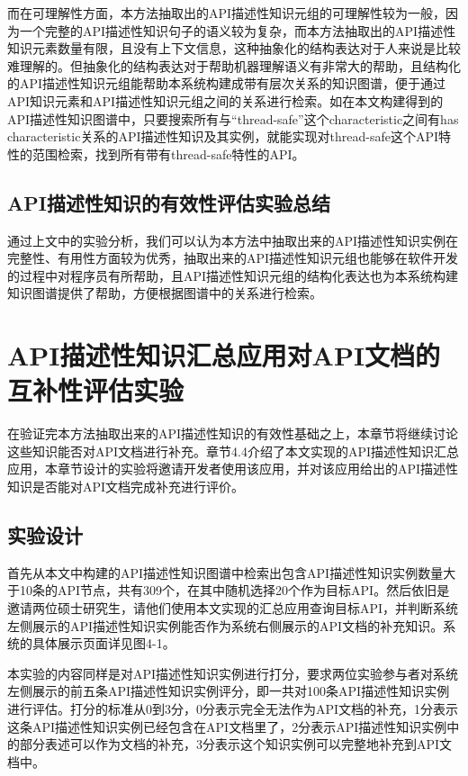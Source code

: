 而在可理解性方面，本方法抽取出的API描述性知识元组的可理解性较为一般，因为一个完整的API描述性知识句子的语义较为复杂，而本方法抽取出的API描述性知识元素数量有限，且没有上下文信息，这种抽象化的结构表达对于人来说是比较难理解的。但抽象化的结构表达对于帮助机器理解语义有非常大的帮助，且结构化的API描述性知识元组能帮助本系统构建成带有层次关系的知识图谱，便于通过API知识元素和API描述性知识元组之间的关系进行检索。如在本文构建得到的API描述性知识图谱中，只要搜索所有与“thread-safe”这个characteristic之间有has characteristic关系的API描述性知识及其实例，就能实现对thread-safe这个API特性的范围检索，找到所有带有thread-safe特性的API。

\subsection{API描述性知识的有效性评估实验总结}
通过上文中的实验分析，我们可以认为本方法中抽取出来的API描述性知识实例在完整性、有用性方面较为优秀，抽取出来的API描述性知识元组也能够在软件开发的过程中对程序员有所帮助，且API描述性知识元组的结构化表达也为本系统构建知识图谱提供了帮助，方便根据图谱中的关系进行检索。

\section{API描述性知识汇总应用对API文档的互补性评估实验}
在验证完本方法抽取出来的API描述性知识的有效性基础之上，本章节将继续讨论这些知识能否对API文档进行补充。章节4.4介绍了本文实现的API描述性知识汇总应用，本章节设计的实验将邀请开发者使用该应用，并对该应用给出的API描述性知识是否能对API文档完成补充进行评价。

\subsection{实验设计}
首先从本文中构建的API描述性知识图谱中检索出包含API描述性知识实例数量大于10条的API节点，共有309个，在其中随机选择20个作为目标API。然后依旧是邀请两位硕士研究生，请他们使用本文实现的汇总应用查询目标API，并判断系统左侧展示的API描述性知识实例能否作为系统右侧展示的API文档的补充知识。系统的具体展示页面详见图4-1。

本实验的内容同样是对API描述性知识实例进行打分，要求两位实验参与者对系统左侧展示的前五条API描述性知识实例评分，即一共对100条API描述性知识实例进行评估。打分的标准从0到3分，0分表示完全无法作为API文档的补充，1分表示这条API描述性知识实例已经包含在API文档里了，2分表示API描述性知识实例中的部分表述可以作为文档的补充，3分表示这个知识实例可以完整地补充到API文档中。

